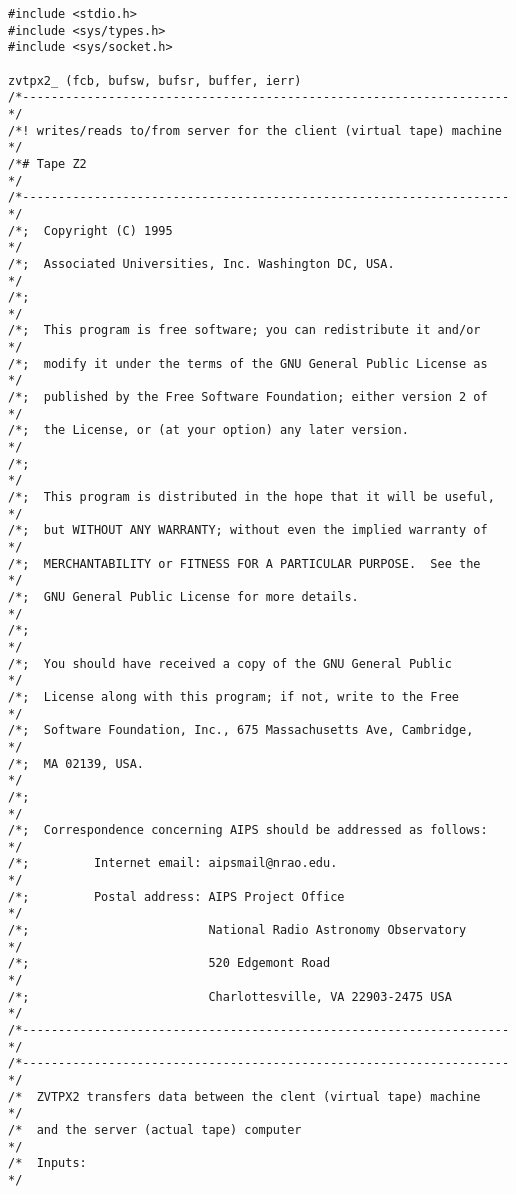 \begin{center}
\begin{verbatim}
#include <stdio.h>
#include <sys/types.h>
#include <sys/socket.h>

zvtpx2_ (fcb, bufsw, bufsr, buffer, ierr)
/*--------------------------------------------------------------------*/
/*! writes/reads to/from server for the client (virtual tape) machine */
/*# Tape Z2                                                           */
/*--------------------------------------------------------------------*/
/*;  Copyright (C) 1995                                               */
/*;  Associated Universities, Inc. Washington DC, USA.                */
/*;                                                                   */
/*;  This program is free software; you can redistribute it and/or    */
/*;  modify it under the terms of the GNU General Public License as   */
/*;  published by the Free Software Foundation; either version 2 of   */
/*;  the License, or (at your option) any later version.              */
/*;                                                                   */
/*;  This program is distributed in the hope that it will be useful,  */
/*;  but WITHOUT ANY WARRANTY; without even the implied warranty of   */
/*;  MERCHANTABILITY or FITNESS FOR A PARTICULAR PURPOSE.  See the    */
/*;  GNU General Public License for more details.                     */
/*;                                                                   */
/*;  You should have received a copy of the GNU General Public        */
/*;  License along with this program; if not, write to the Free       */
/*;  Software Foundation, Inc., 675 Massachusetts Ave, Cambridge,     */
/*;  MA 02139, USA.                                                   */
/*;                                                                   */
/*;  Correspondence concerning AIPS should be addressed as follows:   */
/*;         Internet email: aipsmail@nrao.edu.                        */
/*;         Postal address: AIPS Project Office                       */
/*;                         National Radio Astronomy Observatory      */
/*;                         520 Edgemont Road                         */
/*;                         Charlottesville, VA 22903-2475 USA        */
/*--------------------------------------------------------------------*/
/*--------------------------------------------------------------------*/
/*  ZVTPX2 transfers data between the clent (virtual tape) machine    */
/*  and the server (actual tape) computer                             */
/*  Inputs:                                                           */

\end{verbatim}
\end{center}
